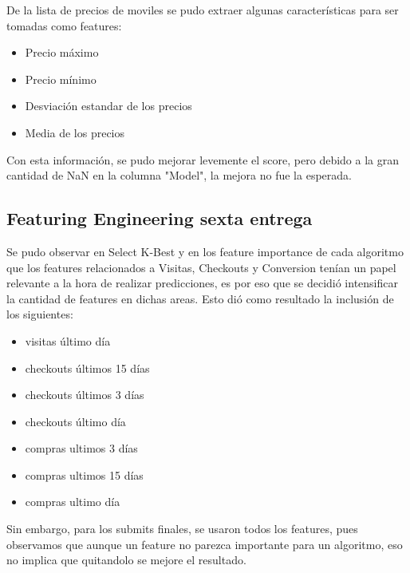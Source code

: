 \documentclass[a4paper ,12pt]{article}
\begin{document}
De la lista de precios de moviles se pudo extraer algunas características para ser tomadas como features:

\begin{itemize}
	\item Precio máximo
	\item Precio mínimo
	\item Desviación estandar de los precios
	\item Media de los precios
\end{itemize}

Con esta información, se pudo mejorar levemente el score, pero debido a la gran cantidad de NaN en la columna "Model", la mejora no fue la esperada.

\subsection{Featuring Engineering sexta entrega}

Se pudo observar en Select K-Best y en los feature importance de cada algoritmo que los features relacionados a Visitas, Checkouts y Conversion tenían un papel relevante a la hora de realizar predicciones, es por eso que se decidió intensificar la cantidad de features en dichas areas. Esto dió como resultado la inclusión de los siguientes:

\begin{itemize}
	
	\item visitas último día
	
	\item checkouts últimos 15 días
	
	\item checkouts últimos 3 días
	
	\item checkouts último día
	
	\item compras ultimos 3 días
	
	\item compras ultimos 15 días
	
	\item compras ultimo día
	
\end{itemize}

Sin embargo, para los submits finales, se usaron todos los features, pues observamos que aunque un feature no parezca importante para un algoritmo, eso no implica que quitandolo se mejore el resultado. 
\end{document}
